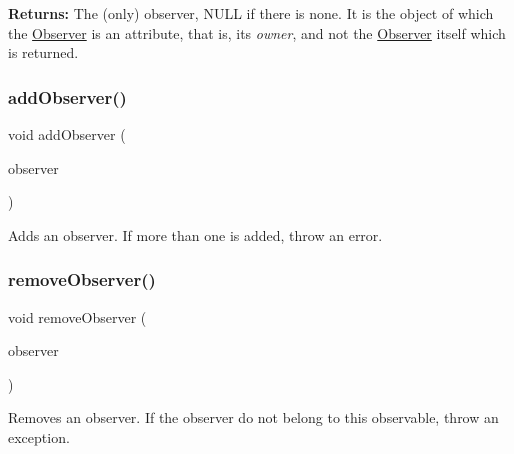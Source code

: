 {\bfseries Returns\+:} The (only) observer, {\ttfamily N\+U\+LL} if there is none. It is the object of which the \mbox{\hyperlink{classKatabatic_1_1Observer}{Observer}} is an attribute, that is, it\textquotesingle{}s {\itshape owner}, and not the \mbox{\hyperlink{classKatabatic_1_1Observer}{Observer}} itself which is returned. \mbox{\label{classKatabatic_1_1Observable_a783fda85eeabe9c660881f236f162767}} 
\subsubsection{\texorpdfstring{add\+Observer()}{addObserver()}}
{\footnotesize\ttfamily void add\+Observer (\begin{DoxyParamCaption}\item[{\mbox{\hyperlink{classKatabatic_1_1BaseObserver}{Base\+Observer}} $\ast$}]{observer }\end{DoxyParamCaption})\hspace{0.3cm}{\ttfamily [inline]}}

Adds an observer. If more than one is added, throw an error. \mbox{\label{classKatabatic_1_1Observable_acaa5a7fc7fa631e3006a42006d753f43}} 
\subsubsection{\texorpdfstring{remove\+Observer()}{removeObserver()}}
{\footnotesize\ttfamily void remove\+Observer (\begin{DoxyParamCaption}\item[{\mbox{\hyperlink{classKatabatic_1_1BaseObserver}{Base\+Observer}} $\ast$}]{observer }\end{DoxyParamCaption})\hspace{0.3cm}{\ttfamily [inline]}}

Removes an observer. If the observer do not belong to this observable, throw an exception. \mbox{\label{classKatabatic_1_1Observable_a52e577fb0c4f2e3650928334fb621c2f}} 
